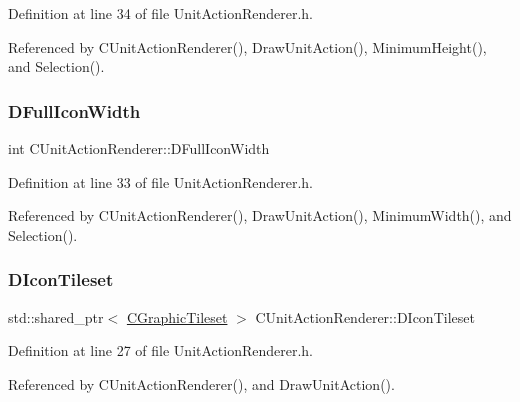 Definition at line 34 of file Unit\+Action\+Renderer.\+h.



Referenced by C\+Unit\+Action\+Renderer(), Draw\+Unit\+Action(), Minimum\+Height(), and Selection().

\hypertarget{classCUnitActionRenderer_a67e5c1650ef8f849c05d9f059d12fb95}{}\label{classCUnitActionRenderer_a67e5c1650ef8f849c05d9f059d12fb95} 
\subsubsection{\texorpdfstring{D\+Full\+Icon\+Width}{DFullIconWidth}}
{\footnotesize\ttfamily int C\+Unit\+Action\+Renderer\+::\+D\+Full\+Icon\+Width\hspace{0.3cm}{\ttfamily [protected]}}



Definition at line 33 of file Unit\+Action\+Renderer.\+h.



Referenced by C\+Unit\+Action\+Renderer(), Draw\+Unit\+Action(), Minimum\+Width(), and Selection().

\hypertarget{classCUnitActionRenderer_a3f5f7cf1840e1aa4b28ab507404a6b3a}{}\label{classCUnitActionRenderer_a3f5f7cf1840e1aa4b28ab507404a6b3a} 
\subsubsection{\texorpdfstring{D\+Icon\+Tileset}{DIconTileset}}
{\footnotesize\ttfamily std\+::shared\+\_\+ptr$<$ \hyperlink{classCGraphicTileset}{C\+Graphic\+Tileset} $>$ C\+Unit\+Action\+Renderer\+::\+D\+Icon\+Tileset\hspace{0.3cm}{\ttfamily [protected]}}



Definition at line 27 of file Unit\+Action\+Renderer.\+h.



Referenced by C\+Unit\+Action\+Renderer(), and Draw\+Unit\+Action().

\hypertarget{classCUnitActionRenderer_a092d5c46d431f75499b194dc7b385ceb}{}\label{classCUnitActionRenderer_a092d5c46d431f75499b194dc7b385ceb} 
